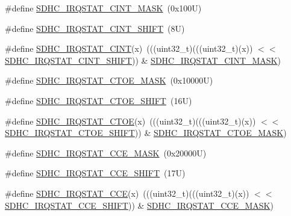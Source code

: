 \begin{DoxyCompactItemize}
\item 
\#define \mbox{\hyperlink{group___s_d_h_c___register___masks_ga2d0fb2d9616c809a5610a537d015ddb6}{S\+D\+H\+C\+\_\+\+I\+R\+Q\+S\+T\+A\+T\+\_\+\+C\+I\+N\+T\+\_\+\+M\+A\+SK}}~(0x100\+U)
\item 
\#define \mbox{\hyperlink{group___s_d_h_c___register___masks_gaf1eb220f726f19220232275f4ba4c42b}{S\+D\+H\+C\+\_\+\+I\+R\+Q\+S\+T\+A\+T\+\_\+\+C\+I\+N\+T\+\_\+\+S\+H\+I\+FT}}~(8\+U)
\item 
\#define \mbox{\hyperlink{group___s_d_h_c___register___masks_ga9147c53fd6c1f66eb58a76b302a3262a}{S\+D\+H\+C\+\_\+\+I\+R\+Q\+S\+T\+A\+T\+\_\+\+C\+I\+NT}}(x)~(((uint32\+\_\+t)(((uint32\+\_\+t)(x)) $<$$<$ \mbox{\hyperlink{group___s_d_h_c___register___masks_gaf1eb220f726f19220232275f4ba4c42b}{S\+D\+H\+C\+\_\+\+I\+R\+Q\+S\+T\+A\+T\+\_\+\+C\+I\+N\+T\+\_\+\+S\+H\+I\+FT}})) \& \mbox{\hyperlink{group___s_d_h_c___register___masks_ga2d0fb2d9616c809a5610a537d015ddb6}{S\+D\+H\+C\+\_\+\+I\+R\+Q\+S\+T\+A\+T\+\_\+\+C\+I\+N\+T\+\_\+\+M\+A\+SK}})
\item 
\#define \mbox{\hyperlink{group___s_d_h_c___register___masks_gac60476a4a3d496ff5f2527af5bbeb006}{S\+D\+H\+C\+\_\+\+I\+R\+Q\+S\+T\+A\+T\+\_\+\+C\+T\+O\+E\+\_\+\+M\+A\+SK}}~(0x10000\+U)
\item 
\#define \mbox{\hyperlink{group___s_d_h_c___register___masks_gac22f4d05d6dd0b5bb27ac12636e46180}{S\+D\+H\+C\+\_\+\+I\+R\+Q\+S\+T\+A\+T\+\_\+\+C\+T\+O\+E\+\_\+\+S\+H\+I\+FT}}~(16\+U)
\item 
\#define \mbox{\hyperlink{group___s_d_h_c___register___masks_gae8eb321aa7f5cbc701c8b46f39dc5f77}{S\+D\+H\+C\+\_\+\+I\+R\+Q\+S\+T\+A\+T\+\_\+\+C\+T\+OE}}(x)~(((uint32\+\_\+t)(((uint32\+\_\+t)(x)) $<$$<$ \mbox{\hyperlink{group___s_d_h_c___register___masks_gac22f4d05d6dd0b5bb27ac12636e46180}{S\+D\+H\+C\+\_\+\+I\+R\+Q\+S\+T\+A\+T\+\_\+\+C\+T\+O\+E\+\_\+\+S\+H\+I\+FT}})) \& \mbox{\hyperlink{group___s_d_h_c___register___masks_gac60476a4a3d496ff5f2527af5bbeb006}{S\+D\+H\+C\+\_\+\+I\+R\+Q\+S\+T\+A\+T\+\_\+\+C\+T\+O\+E\+\_\+\+M\+A\+SK}})
\item 
\#define \mbox{\hyperlink{group___s_d_h_c___register___masks_ga1d6ab12c7170114b3836f7dfd0cb085a}{S\+D\+H\+C\+\_\+\+I\+R\+Q\+S\+T\+A\+T\+\_\+\+C\+C\+E\+\_\+\+M\+A\+SK}}~(0x20000\+U)
\item 
\#define \mbox{\hyperlink{group___s_d_h_c___register___masks_gaf568e7274912a3580885d9852483470f}{S\+D\+H\+C\+\_\+\+I\+R\+Q\+S\+T\+A\+T\+\_\+\+C\+C\+E\+\_\+\+S\+H\+I\+FT}}~(17\+U)
\item 
\#define \mbox{\hyperlink{group___s_d_h_c___register___masks_ga16bb6d7218b46f5ff46445eab2377223}{S\+D\+H\+C\+\_\+\+I\+R\+Q\+S\+T\+A\+T\+\_\+\+C\+CE}}(x)~(((uint32\+\_\+t)(((uint32\+\_\+t)(x)) $<$$<$ \mbox{\hyperlink{group___s_d_h_c___register___masks_gaf568e7274912a3580885d9852483470f}{S\+D\+H\+C\+\_\+\+I\+R\+Q\+S\+T\+A\+T\+\_\+\+C\+C\+E\+\_\+\+S\+H\+I\+FT}})) \& \mbox{\hyperlink{group___s_d_h_c___register___masks_ga1d6ab12c7170114b3836f7dfd0cb085a}{S\+D\+H\+C\+\_\+\+I\+R\+Q\+S\+T\+A\+T\+\_\+\+C\+C\+E\+\_\+\+M\+A\+SK}})
$$
\end{DoxyCompactItemize}
